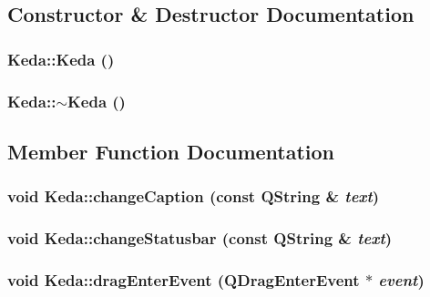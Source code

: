 \subsection{Constructor \& Destructor Documentation}
\subsubsection{\setlength{\rightskip}{0pt plus 5cm}Keda::Keda ()}\label{classKeda_bdcde5bd2edacf1aabd359bcb83de9a2}


\subsubsection{\setlength{\rightskip}{0pt plus 5cm}Keda::$\sim$Keda ()}\label{classKeda_29492221c9b967fa0983a48503b2e371}




\subsection{Member Function Documentation}
\subsubsection{\setlength{\rightskip}{0pt plus 5cm}void Keda::change\-Caption (const QString \& {\em text})\hspace{0.3cm}{\tt  [private, slot]}}\label{classKeda_52961c3165b7817bdd6bec5a017670a5}


\subsubsection{\setlength{\rightskip}{0pt plus 5cm}void Keda::change\-Statusbar (const QString \& {\em text})\hspace{0.3cm}{\tt  [private, slot]}}\label{classKeda_d8f40236954797adc7686383a2ebf1cd}


\subsubsection{\setlength{\rightskip}{0pt plus 5cm}void Keda::drag\-Enter\-Event (QDrag\-Enter\-Event $\ast$ {\em event})\hspace{0.3cm}{\tt  [protected, virtual]}}\label{classKeda_dba09a7801d36df546c0f3e9dac3ec02}


